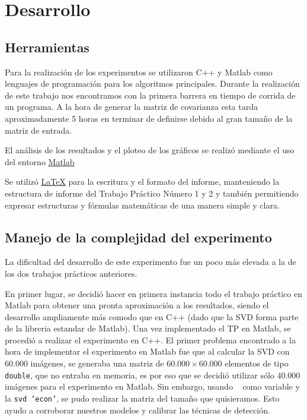 \section{Desarrollo}

\subsection{Herramientas}

Para la realizaci\'on de los experimentos se utilizaron C++ y Matlab como lenguajes de
programaci\'on para los algoritmos principales. Durante la realizaci\'on de este trabajo nos encontramos con
la primera barrera en tiempo de corrida de un programa. A la hora de generar la
matriz de covarianza esta tarda aproximadamente 5 horas en terminar de definirse
debido al gran tama\~no de la matriz de entrada.

El an\'alisis de los resultados y el ploteo de los gr\'aficos se realiz\'o
mediante el uso del entorno \href{http://www.Matlab.com/}{Matlab}

Se utiliz\'o \href{http://www.latex-project.org/}{\LaTeX} para la escritura y el formato del informe,
manteniendo la estructura de informe del Trabajo Pr\'actico N\'umero 1 y 2 y tambi\'en
permitiendo expresar estructuras y f\'ormulas matem\'aticas de una manera simple y clara.

\subsection{Manejo de la complejidad del experimento}

La dificultad del desarrollo de este experimento fue un poco m\'as elevada a la de los dos
trabajos pr\'acticos anteriores.

En primer lugar, se decidi\'o hacer en primera instancia todo el trabajo pr\'actico en Matlab para obtener
una pronta aproximaci\'on a los resultados, siendo el desarrollo ampliamente m\'as comodo que
en C++ (dado que la SVD forma parte de la libreria estandar de Matlab). Una vez implementado
el TP en Matlab, se procedi\'o a realizar el experimento en C++. El primer problema encontrado
a la hora de implementar el experimento en Matlab fue que al calcular la SVD con 60.000 im\'agenes,
se generaba una matriz de $60.000 \times 60.000$ elementos de tipo \texttt{double}, que no entraba en
memoria, es por eso que se decidi\'o utilizar s\'olo 40.000 im\'agenes para el experimento en Matlab.
Sin embargo, usando \texttt{~} como variable y la \texttt{svd 'econ'}, se pudo realizar la matriz
del tama\~no que quisieramos. Esto ayudo a corroborar nuestros modelos y calibrar las t\'ecnicas de
detecci\'on.


